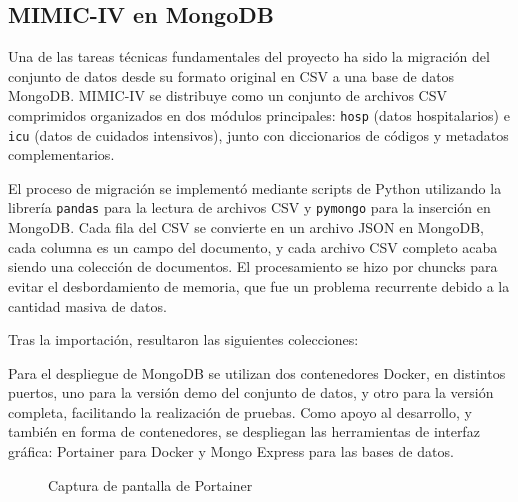 \subsection{MIMIC-IV en MongoDB}


Una de las tareas técnicas fundamentales del proyecto ha sido la migración del conjunto de datos desde su formato original en CSV a una base de datos MongoDB. MIMIC-IV se distribuye como un conjunto de archivos CSV comprimidos organizados en dos módulos principales: \texttt{hosp} (datos hospitalarios) e \texttt{icu} (datos de cuidados intensivos), junto con diccionarios de códigos y metadatos complementarios.


El proceso de migración se implementó mediante scripts de Python utilizando la librería \texttt{pandas} para la lectura de archivos CSV y \texttt{pymongo} para la inserción en MongoDB. Cada fila del CSV se convierte en un archivo JSON en MongoDB, cada columna es un campo del documento, y cada archivo CSV completo acaba siendo una colección de documentos. El procesamiento se hizo por chuncks para evitar el desbordamiento de memoria, que fue un problema recurrente debido a la cantidad masiva de datos.


Tras la importación, resultaron las siguientes colecciones:




Para el despliegue de MongoDB se utilizan dos contenedores Docker, en distintos puertos, uno para la versión demo del conjunto de datos, y otro para la versión completa, facilitando la realización de pruebas. Como apoyo al desarrollo, y también en forma de contenedores, se despliegan las herramientas de interfaz gráfica: Portainer para Docker\cite{portainer_ce} y Mongo Express para las bases de datos\cite{mongo_express}. 

\begin{figure}[H]
  \centering
  \caption{Captura de pantalla de Portainer}
  \label{fig:screenshot1s}
\end{figure}


